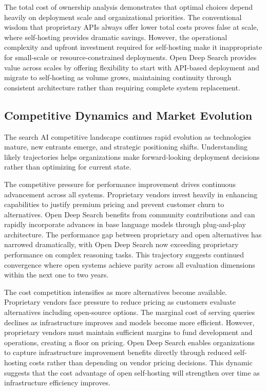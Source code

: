 The total cost of ownership analysis demonstrates that optimal choices depend heavily on deployment scale and organizational priorities. The conventional wisdom that proprietary APIs always offer lower total costs proves false at scale, where self-hosting provides dramatic savings. However, the operational complexity and upfront investment required for self-hosting make it inappropriate for small-scale or resource-constrained deployments. Open Deep Search provides value across scales by offering flexibility to start with API-based deployment and migrate to self-hosting as volume grows, maintaining continuity through consistent architecture rather than requiring complete system replacement.

\subsection{Competitive Dynamics and Market Evolution}

The search AI competitive landscape continues rapid evolution as technologies mature, new entrants emerge, and strategic positioning shifts. Understanding likely trajectories helps organizations make forward-looking deployment decisions rather than optimizing for current state.

The competitive pressure for performance improvement drives continuous advancement across all systems. Proprietary vendors invest heavily in enhancing capabilities to justify premium pricing and prevent customer churn to alternatives. Open Deep Search benefits from community contributions and can rapidly incorporate advances in base language models through plug-and-play architecture. The performance gap between proprietary and open alternatives has narrowed dramatically, with Open Deep Search now exceeding proprietary performance on complex reasoning tasks. This trajectory suggests continued convergence where open systems achieve parity across all evaluation dimensions within the next one to two years.

The cost competition intensifies as more alternatives become available. Proprietary vendors face pressure to reduce pricing as customers evaluate alternatives including open-source options. The marginal cost of serving queries declines as infrastructure improves and models become more efficient. However, proprietary vendors must maintain sufficient margins to fund development and operations, creating a floor on pricing. Open Deep Search enables organizations to capture infrastructure improvement benefits directly through reduced self-hosting costs rather than depending on vendor pricing decisions. This dynamic suggests that the cost advantage of open self-hosting will strengthen over time as infrastructure efficiency improves.

